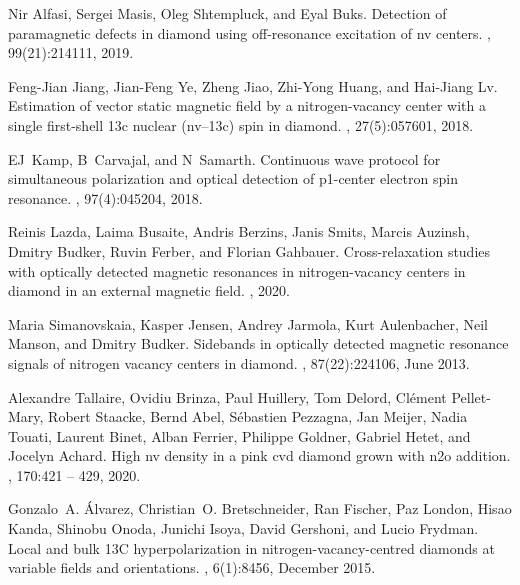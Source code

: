 \documentclass[9pt,twocolumn,twoside]{revtex4-1}
\begin{document}
\begin{thebibliography}{1}

Nir Alfasi, Sergei Masis, Oleg Shtempluck, and Eyal Buks.
\newblock Detection of paramagnetic defects in diamond using off-resonance
  excitation of nv centers.
, 99(21):214111, 2019.

Feng-Jian Jiang, Jian-Feng Ye, Zheng Jiao, Zhi-Yong Huang, and Hai-Jiang Lv.
\newblock Estimation of vector static magnetic field by a nitrogen-vacancy
  center with a single first-shell 13c nuclear (nv--13c) spin in diamond.
, 27(5):057601, 2018.

EJ~Kamp, B~Carvajal, and N~Samarth.
\newblock Continuous wave protocol for simultaneous polarization and optical
  detection of p1-center electron spin resonance.
, 97(4):045204, 2018.

Reinis Lazda, Laima Busaite, Andris Berzins, Janis Smits, Marcis Auzinsh,
  Dmitry Budker, Ruvin Ferber, and Florian Gahbauer.
\newblock Cross-relaxation studies with optically detected magnetic resonances
  in nitrogen-vacancy centers in diamond in an external magnetic field.
, 2020.

Maria Simanovskaia, Kasper Jensen, Andrey Jarmola, Kurt Aulenbacher, Neil
  Manson, and Dmitry Budker.
\newblock Sidebands in optically detected magnetic resonance signals of
  nitrogen vacancy centers in diamond.
, 87(22):224106, June 2013.

Alexandre Tallaire, Ovidiu Brinza, Paul Huillery, Tom Delord, Clément
  Pellet-Mary, Robert Staacke, Bernd Abel, Sébastien Pezzagna, Jan Meijer,
  Nadia Touati, Laurent Binet, Alban Ferrier, Philippe Goldner, Gabriel Hetet,
  and Jocelyn Achard.
\newblock High nv density in a pink cvd diamond grown with n2o addition.
, 170:421 -- 429, 2020.

Gonzalo~A. Álvarez, Christian~O. Bretschneider, Ran Fischer, Paz London, Hisao
  Kanda, Shinobu Onoda, Junichi Isoya, David Gershoni, and Lucio Frydman.
\newblock Local and bulk {13C} hyperpolarization in nitrogen-vacancy-centred
  diamonds at variable fields and orientations.
, 6(1):8456, December 2015.

\end{thebibliography}
\end{document}
